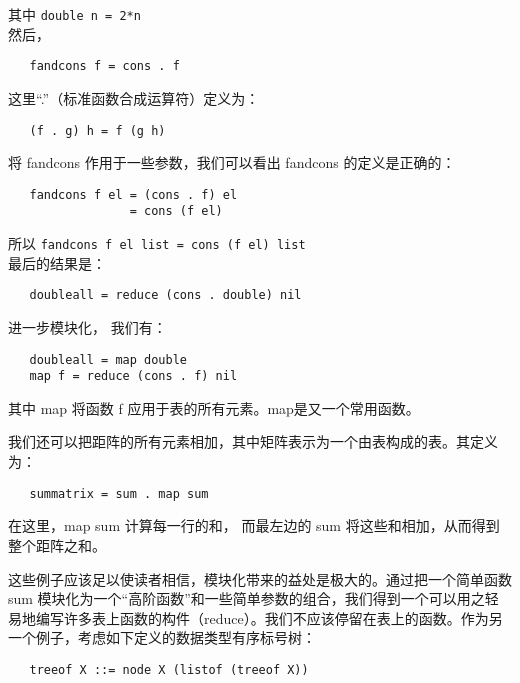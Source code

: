 \documentclass[12pt,a4paper]{article}
\begin{document}
其中 \verb"double n = 2*n"\\

然后，
 
\begin{verbatim}
   fandcons f = cons . f
\end{verbatim}
  
这里``.''（标准函数合成运算符）定义为：

\begin{verbatim}
   (f . g) h = f (g h)
\end{verbatim}

将 fandcons 作用于一些参数，我们可以看出 fandcons 的定义是正确的：

\begin{verbatim}
   fandcons f el = (cons . f) el
                 = cons (f el)
\end{verbatim}

所以 \verb"fandcons f el list = cons (f el) list"\\

最后的结果是：

\begin{verbatim}
   doubleall = reduce (cons . double) nil
\end{verbatim}

进一步模块化， 我们有：

\begin{verbatim}
   doubleall = map double
   map f = reduce (cons . f) nil
\end{verbatim}

其中 map 将函数 f 应用于表的所有元素。map是又一个常用函数。

我们还可以把距阵的所有元素相加，其中矩阵表示为一个由表构成的表。其定义为：

\begin{verbatim}
   summatrix = sum . map sum
\end{verbatim}

在这里，map sum 计算每一行的和， 而最左边的 sum 将这些和相加，从而得到整个距阵之和。

这些例子应该足以使读者相信，模块化带来的益处是极大的。通过把一个简单函数 sum 模块化为一个``高阶函数''和一些简单参数的组合，我们得到一个可以用之轻易地编写许多表上函数的构件（reduce）。我们不应该停留在表上的函数。作为另一个例子，考虑如下定义的数据类型有序标号树：

\begin{verbatim}
   treeof X ::= node X (listof (treeof X))
\end{verbatim}
\end{document}
